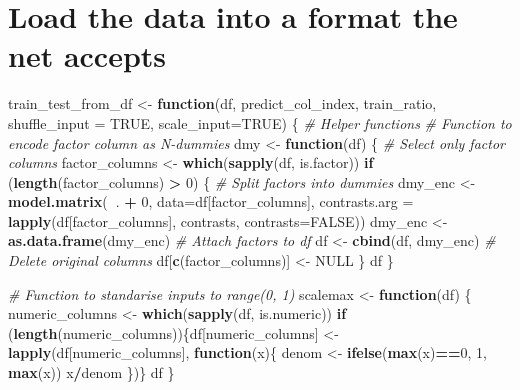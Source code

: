 \documentclass[]{book}
\newenvironment{Shaded}{\begin{snugshade}}{\end{snugshade}}
\newcommand{\CommentTok}[1]{\textcolor[rgb]{0.56,0.35,0.01}{\textit{#1}}}
\newcommand{\ControlFlowTok}[1]{\textcolor[rgb]{0.13,0.29,0.53}{\textbf{#1}}}
\newcommand{\DataTypeTok}[1]{\textcolor[rgb]{0.13,0.29,0.53}{#1}}
\newcommand{\DecValTok}[1]{\textcolor[rgb]{0.00,0.00,0.81}{#1}}
\newcommand{\KeywordTok}[1]{\textcolor[rgb]{0.13,0.29,0.53}{\textbf{#1}}}
\newcommand{\NormalTok}[1]{#1}
\newcommand{\OperatorTok}[1]{\textcolor[rgb]{0.81,0.36,0.00}{\textbf{#1}}}
\newcommand{\OtherTok}[1]{\textcolor[rgb]{0.56,0.35,0.01}{#1}}
\newcommand{\StringTok}[1]{\textcolor[rgb]{0.31,0.60,0.02}{#1}}
\begin{document}
\hypertarget{load-the-data-into-a-format-the-net-accepts}{%
\section{Load the data into a format the net accepts}\label{load-the-data-into-a-format-the-net-accepts}}

\begin{Shaded}
\begin{Highlighting}[]
\NormalTok{train_test_from_df <-}\StringTok{ }\ControlFlowTok{function}\NormalTok{(df, predict_col_index, train_ratio, }
                               \DataTypeTok{shuffle_input =} \OtherTok{TRUE}\NormalTok{, }\DataTypeTok{scale_input=}\OtherTok{TRUE}\NormalTok{)}
\NormalTok{\{}
  \CommentTok{# Helper functions}
  \CommentTok{# Function to encode factor column as N-dummies}
\NormalTok{  dmy <-}\StringTok{ }\ControlFlowTok{function}\NormalTok{(df)}
\NormalTok{  \{}
    \CommentTok{# Select only factor columns}
\NormalTok{    factor_columns <-}\StringTok{ }\KeywordTok{which}\NormalTok{(}\KeywordTok{sapply}\NormalTok{(df, is.factor))}
    \ControlFlowTok{if}\NormalTok{ (}\KeywordTok{length}\NormalTok{(factor_columns) }\OperatorTok{>}\StringTok{ }\DecValTok{0}\NormalTok{)}
\NormalTok{    \{}
      \CommentTok{# Split factors into dummies}
\NormalTok{      dmy_enc <-}\StringTok{ }\KeywordTok{model.matrix}\NormalTok{(}\OperatorTok{~}\NormalTok{. }\OperatorTok{+}\StringTok{ }\DecValTok{0}\NormalTok{, }\DataTypeTok{data=}\NormalTok{df[factor_columns], }
                              \DataTypeTok{contrasts.arg =} \KeywordTok{lapply}\NormalTok{(df[factor_columns], }
\NormalTok{                                                     contrasts, }\DataTypeTok{contrasts=}\OtherTok{FALSE}\NormalTok{))}
\NormalTok{      dmy_enc <-}\StringTok{ }\KeywordTok{as.data.frame}\NormalTok{(dmy_enc)}
      \CommentTok{# Attach factors to df}
\NormalTok{      df <-}\StringTok{ }\KeywordTok{cbind}\NormalTok{(df, dmy_enc)}
      \CommentTok{# Delete original columns}
\NormalTok{      df[}\KeywordTok{c}\NormalTok{(factor_columns)] <-}\StringTok{ }\OtherTok{NULL}
\NormalTok{    \}}
\NormalTok{    df}
\NormalTok{  \}}
  
  \CommentTok{# Function to standarise inputs to range(0, 1)}
\NormalTok{  scalemax <-}\StringTok{ }\ControlFlowTok{function}\NormalTok{(df)}
\NormalTok{  \{}
\NormalTok{    numeric_columns <-}\StringTok{ }\KeywordTok{which}\NormalTok{(}\KeywordTok{sapply}\NormalTok{(df, is.numeric))}
    \ControlFlowTok{if}\NormalTok{ (}\KeywordTok{length}\NormalTok{(numeric_columns))\{df[numeric_columns] <-}\StringTok{ }\KeywordTok{lapply}\NormalTok{(df[numeric_columns], }\ControlFlowTok{function}\NormalTok{(x)\{}
\NormalTok{      denom <-}\StringTok{ }\KeywordTok{ifelse}\NormalTok{(}\KeywordTok{max}\NormalTok{(x)}\OperatorTok{==}\DecValTok{0}\NormalTok{, }\DecValTok{1}\NormalTok{, }\KeywordTok{max}\NormalTok{(x))}
\NormalTok{      x}\OperatorTok{/}\NormalTok{denom}
\NormalTok{    \})\}}
\NormalTok{    df}
\NormalTok{  \}}


\end{Highlighting}
\end{Shaded}
\end{document}
